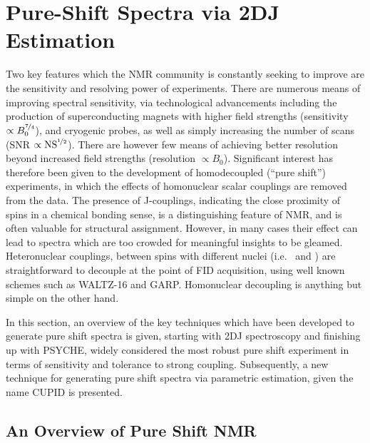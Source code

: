 \section{Pure-Shift Spectra via \acl{2DJ} Estimation}
\label{sec:pure-shift}

Two key features which the \ac{NMR} community is constantly seeking to improve
are the sensitivity and resolving power of experiments. There are
numerous means of improving spectral sensitivity, via technological
advancements including the production of superconducting magnets with higher
field strengths (sensitivity $\propto B_0^{\nicefrac{7}{4}}$),
and cryogenic probes\cite{Kovacs2005}, as well as simply increasing the number
of scans (\ac{SNR} $\propto \text{NS}^{\nicefrac{1}{2}}$).  There are however
few means of achieving better resolution beyond increased field strengths
(resolution $\propto B_0$). Significant interest has therefore been
given to the development of homodecoupled (``pure shift'')
experiments\cite{Meyer2013,Adams2014,Zangger2015}, in which the
effects of homonuclear scalar couplings are removed from the data. The presence
of J-couplings, indicating the close proximity of spins in a chemical
bonding sense, is a distinguishing feature of \ac{NMR}, and is often valuable for
structural assignment. However, in many cases their effect can lead to spectra
which are too crowded for meaningful insights to be gleamed.  Heteronuclear
couplings, between spins with different nuclei (i.e. \proton\ and \carbon) are
straightforward to decouple at the point of \ac{FID} acquisition, using well
known schemes such as WALTZ-16\cite{Shaka1983a, Shaka1983b} and
GARP\cite{Shaka1985}. Homonuclear decoupling is anything but simple on the
other hand.

In this section, an overview of the key techniques which have
been developed to generate pure shift spectra is given, starting with \ac{2DJ}
spectroscopy and finishing up with \ac{PSYCHE}, widely considered the most
robust pure shift experiment in terms of sensitivity and tolerance to strong
coupling. Subsequently, a new technique for generating pure shift spectra via
parametric estimation, given the name \ac{CUPID} is presented.

\subsection{An Overview of Pure Shift NMR}

